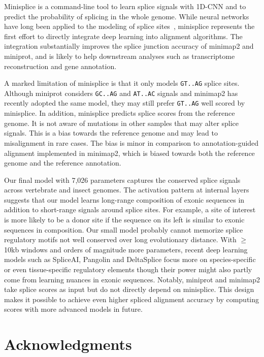 \documentclass[webpdf,contemporary,large,namedate]{oup-authoring-template}%
\begin{document}
Minisplice is a command-line tool to learn splice signals with 1D-CNN
and to predict the probability of splicing in the whole genome.
While neural networks have long been applied to the modeling of splice sites~\citep{Reese:1997aa},
minisplice represents the first effort to directly integrate deep learning into alignment algorithms.
The integration substantially improves the splice junction accuracy of minimap2 and miniprot,
and is likely to help downstream analyses such as transcriptome reconstruction and gene annotation.

A marked limitation of minisplice is that it only models {\tt GT..AG} splice sites.
Although miniprot considers {\tt GC..AG} and {\tt AT..AC} signals and minimap2 has recently adopted the same model,
they may still prefer {\tt GT..AG} well scored by minisplice.
In addition, minisplice predicts splice scores from the reference genome.
It is not aware of mutations in other samples that may alter splice signals.
This is a bias towards the reference genome and may lead to misalignment in rare cases.
The bias is minor in comparison to annotation-guided alignment implemented in minimap2,
which is biased towards both the reference genome and the reference annotation.

Our final model with 7,026 parameters captures the conserved splice signals across vertebrate and insect genomes.
The activation pattern at internal layers suggests that our model
learns long-range composition of exonic sequences in addition to short-range signals around splice sites.
For example, a site of interest is more likely to be a donor site if the sequence on its left is similar to exonic sequences in composition.
Our small model probably cannot memorize splice regulatory motifs not well conserved over long evolutionary distance.
With $\ge$10kb windows and orders of magnitude more parameters, recent deep learning models
such as SpliceAI, Pangolin and DeltaSplice focus more on species-specific or even tissue-specific regulatory elements
though their power might also partly come from learning nuances in exonic sequences.
Notably, miniprot and minimap2 take splice scores as input but do not directly depend on minisplice.
This design makes it possible to achieve even higher spliced alignment accuracy
by computing scores with more advanced models in future.

\section*{Acknowledgments}
\end{document}
